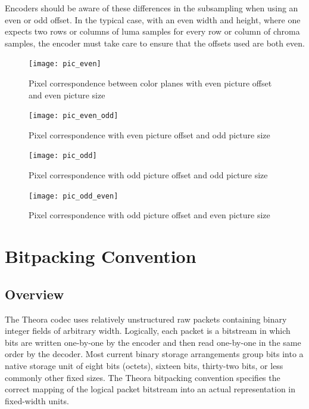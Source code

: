 \documentclass[9pt,letterpaper]{book}
\numberwithin{equation}{chapter}
\numberwithin{figure}{chapter}
\numberwithin{table}{chapter}
\begin{document}
Encoders should be aware of these differences in the subsampling when using an
 even or odd offset.
In the typical case, with an even width and height, where one expects two rows
 or columns of luma samples for every row or column of chroma samples, the
 encoder must take care to ensure that the offsets used are both even.

\begin{figure}[htbp]
\begin{center}
\texttt{[image: pic\_even]}
\end{center}
\caption{Pixel correspondence between color planes with even picture 
 offset and even picture size}
\label{fig:pic_even}
\end{figure}

\begin{figure}[htbp]
\begin{center}
\texttt{[image: pic\_even\_odd]}
\end{center}
\caption{Pixel correspondence with even picture offset and 
 odd picture size}
\label{fig:pic_even_odd}
\end{figure}

\begin{figure}[htbp]
\begin{center}
\texttt{[image: pic\_odd]}
\end{center}
\caption{Pixel correspondence with odd picture offset and 
 odd picture size}
\label{fig:pic_odd}
\end{figure}

\begin{figure}[htbp]
\begin{center}
\texttt{[image: pic\_odd\_even]}
\end{center}
\caption{Pixel correspondence with odd picture offset and 
 even picture size}
\label{fig:pic_odd_even}
\end{figure}


\chapter{Bitpacking Convention}
\label{sec:bitpacking}

\section{Overview}

The Theora codec uses relatively unstructured raw packets containing
 binary integer fields of arbitrary width.
Logically, each packet is a bitstream in which bits are written one-by-one by
 the encoder and then read one-by-one in the same order by the decoder.
Most current binary storage arrangements group bits into a native storage unit
 of eight bits (octets), sixteen bits, thirty-two bits, or less commonly other
 fixed sizes.
The Theora bitpacking convention specifies the correct mapping of the logical
 packet bitstream into an actual representation in fixed-width units.
\end{document}
